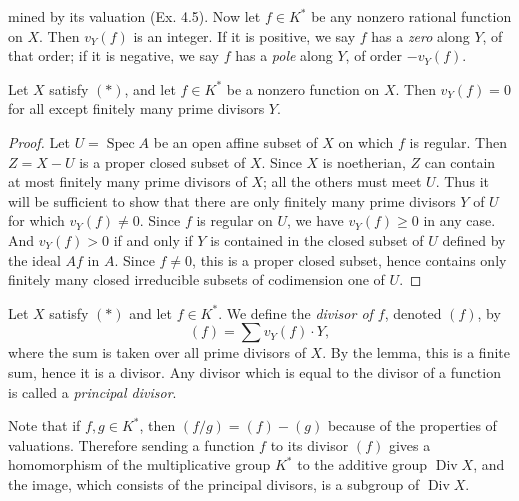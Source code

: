 

\DeclareMathOperator{\Spec}{Spec}
\DeclareMathOperator{\Div}{Div}
\DeclareMathOperator{\Cl}{Cl}


mined by its valuation (Ex. 4.5). Now let $f \in K^*$ be any nonzero rational
function on $X$. Then $v_Y(f)$ is an integer. If it is positive, we say $f$
has a \emph{zero} along $Y$, of that order; if it is negative, we say $f$
has a \emph{pole} along $Y$, of order $-v_Y(f)$.

\begin{lemma}[6.1]
Let $X$ satisfy $(*)$, and let $f \in K^*$ be a nonzero function on $X$.
Then $v_Y(f) = 0$ for all except finitely many prime divisors $Y$.
\end{lemma}

\begin{proof}
Let $U = \Spec A$ be an open affine subset of $X$ on which $f$ is regular.
Then $Z = X - U$ is a proper closed subset of $X$. Since $X$ is noetherian,
$Z$ can contain at most finitely many prime divisors of $X$; all the others
must meet $U$. Thus it will be sufficient to show that there are only
finitely many prime divisors $Y$ of $U$ for which $v_Y(f) \ne 0$. Since $f$
is regular on $U$, we have $v_Y(f) \ge 0$ in any case. And $v_Y(f) > 0$ if
and only if $Y$ is contained in the closed subset of $U$ defined by the ideal
$Af$ in $A$. Since $f \ne 0$, this is a proper closed subset, hence contains
only finitely many closed irreducible subsets of codimension one of $U$.
\end{proof}

\begin{definition}
Let $X$ satisfy $(*)$ and let $f \in K^*$. We define the \emph{divisor of
$f$}, denoted $(f)$, by
\[
  (f) = \sum v_Y(f) \cdot Y,
\]
where the sum is taken over all prime divisors of $X$. By the lemma, this is a
finite sum, hence it is a divisor. Any divisor which is equal to the divisor
of a function is called a \emph{principal divisor}.
\end{definition}

Note that if $f,g \in K^*$, then $(f/g) = (f) - (g)$ because of the
properties of valuations. Therefore sending a function $f$ to its divisor
$(f)$ gives a homomorphism of the multiplicative group $K^*$ to the additive
group $\Div X$, and the image, which consists of the principal divisors, is a
subgroup of $\Div X$.

